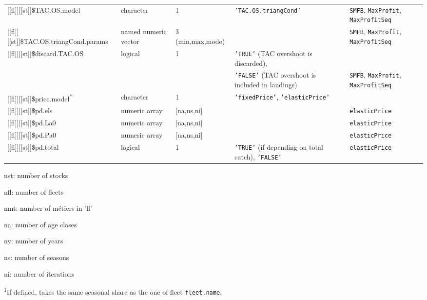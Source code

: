 \begin{landscape}
\begin{table}[!ht]
\begin{footnotesize}
\begin{threeparttable}
\begin{tabular}{lllll}
        {[[fl]]}[[st]]\$TAC.OS.model & character & 1 & \texttt{'TAC.OS.triangCond'} & \texttt{SMFB}, \texttt{MaxProfit}, \texttt{MaxProfitSeq} \\
        {[[fl]]}[[st]]\$TAC.OS.triangCond.params & named numeric vector & 3 (min,max,mode) &  & \texttt{SMFB}, \texttt{MaxProfit}, \texttt{MaxProfitSeq} \\
        {[[fl]]}[[st]]\$discard.TAC.OS & logical & 1 & \texttt{'TRUE'} (TAC overshoot is discarded), \\
         &  &  & \texttt{'FALSE'} (TAC overshoot is included in landings) & \texttt{SMFB}, \texttt{MaxProfit}, \texttt{MaxProfitSeq} \\
        {[[fl]]}[[st]]\$price.model\textsuperscript{*} & character & 1 & \texttt{'fixedPrice'}, \texttt{'elasticPrice'} &  \\
        {[[fl]]}[[st]]\$pd.els & numeric array & [na,ns,ni] &  &  \texttt{elasticPrice} \\
        {[[fl]]}[[st]]\$pd.La0 & numeric array & [na,ns,ni] &  &  \texttt{elasticPrice} \\
        {[[fl]]}[[st]]\$pd.Pa0 & numeric array & [na,ns,ni] &  &  \texttt{elasticPrice} \\
        {[[fl]]}[[st]]\$pd.total & logical & 1 & \texttt{'TRUE'} (if depending on total catch), \texttt{'FALSE'} & 
          \texttt{elasticPrice} \\
        \hline
      \end{tabular}
      
      \begin{tablenotes}
        \item nst: number of stocks
        \item nfl: number of fleets
        \item nmt: number of m\'etiers in 'fl'
        \item na: number of age clases
        \item ny: number of years
        \item ns: number of seasons
        \item ni: number of iterations
        \item \textsuperscript{1}If defined, takes the same seasonal share as the one of fleet \texttt{fleet.name}.
      \end{tablenotes}
      
    \end{threeparttable}
  \end{footnotesize}


\end{table}
\end{landscape}
